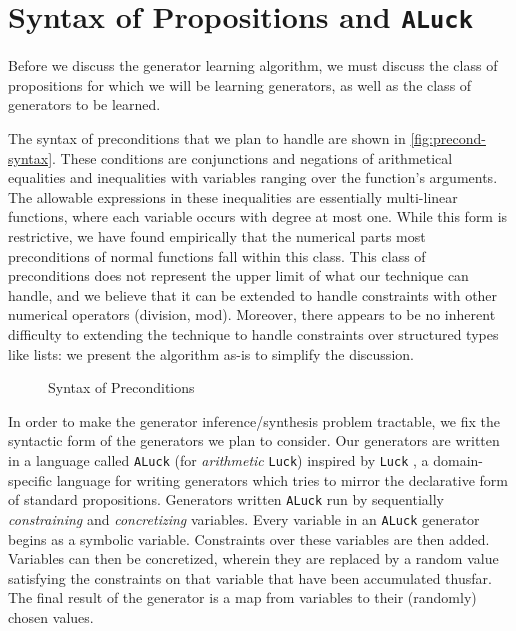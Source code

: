 \documentclass[10pt,a4paper]{article}
\begin{document}
\section{Syntax of Propositions and \texttt{ALuck}}
\label{sec:luck}

Before we discuss the generator learning algorithm, we must discuss the class of propositions for which we will be learning generators, as well as the class of generators to be learned.

The syntax of preconditions that we plan to handle are shown in \autoref{fig:precond-syntax}. These conditions are conjunctions and negations of arithmetical equalities and inequalities with variables ranging over the function's arguments. The allowable expressions in these inequalities are essentially multi-linear functions, where each variable occurs with degree at most one. While this form is restrictive, we have found empirically that the numerical parts most preconditions of normal functions fall within this class. This class of preconditions does not represent the upper limit of what our technique can handle, and we believe that it can be extended to handle constraints with other numerical operators (division, mod). Moreover, there appears to be no inherent difficulty to extending the technique to handle constraints over structured types like lists: we present the algorithm as-is to simplify the discussion.

\begin{figure}
\caption{Syntax of Preconditions}
\label{fig:precond-syntax}
\end{figure}

In order to make the generator inference/synthesis problem tractable, we fix the syntactic form of the generators we plan to consider. Our generators are written in a language called \texttt{ALuck} (for \textit{arithmetic} \texttt{Luck}) inspired by \texttt{Luck} \cite{luck}, a domain-specific language for writing generators which tries to mirror the declarative form of standard propositions. Generators written \texttt{ALuck} run by sequentially \textit{constraining} and \textit{concretizing} variables. Every variable in an \texttt{ALuck} generator begins as a symbolic variable. Constraints over these variables are then added. Variables can then be concretized, wherein they are replaced by a random value satisfying the constraints on that variable that have been accumulated thusfar. The final result of the generator is a map from variables to their (randomly) chosen values.
\end{document}
